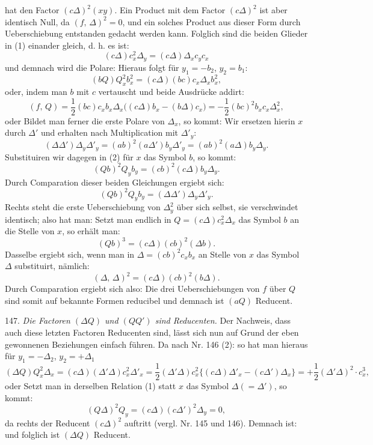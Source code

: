 hat den Factor $(c\Delta)^2(xy)$. Ein Product mit dem Factor $(c\Delta)^2$ ist aber identisch Null, da $(f,\,\Delta)^2 = 0$, und ein solches Product aus dieser Form durch Ueberschiebung entstanden gedacht werden kann. Folglich sind die beiden Glieder in (1) einander gleich, d. h. es ist:
\[
(c\Delta)c_x^2 \Delta_y = (c\Delta)\Delta_x c_y c_x
\]
und demnach wird die Polare:
Hieraus folgt für $y_1 = -b_2$, $y_2 = b_1$:
\[
(bQ)Q_x^2 b_x^2 = (c\Delta)(bc)c_x \Delta_x b_x^2,
\]
oder, indem man $b$ mit $c$ vertauscht und beide Ausdrücke addirt:
\[
(f,\,Q) = \frac{1}{2}(bc)c_x b_x \Delta_x \big((c\Delta)b_x - (b\Delta)c_x\big)
= -\frac{1}{2}(bc)^2 b_x c_x \Delta_x^2,
\]
oder
Bildet man ferner die erste Polare von $\Delta_x$, so kommt:
Wir ersetzen hierin $x$ durch $\Delta'$ und erhalten nach Multiplication mit $\Delta'_y$:
\[
(\Delta\Delta')\Delta_y \Delta'_y = (ab)^2(a\Delta')b_y \Delta'_y = (ab)^2(a\Delta)b_y \Delta_y.
\]
Substituiren wir dagegen in (2) für $x$ das Symbol $b$, so kommt:
\[
(Qb)^2 Q_y b_y = (cb)^2(c\Delta)b_y \Delta_y.
\]
Durch Comparation dieser beiden Gleichungen ergiebt sich:
\[
(Qb)^2 Q_y b_y = (\Delta\Delta')\Delta_y \Delta'_y.
\]
Rechts steht die erste Ueberschiebung von $\Delta_y^2$ über sich selbst, sie verschwindet identisch; also hat man:
Setzt man endlich in $Q = (c\Delta)c_x^2 \Delta_x$ das Symbol $b$ an die Stelle von $x$, so erhält man:
\[
(Qb)^3 = (c\Delta)(cb)^2(\Delta b).
\]
Dasselbe ergiebt sich, wenn man in $\Delta = (cb)^2 c_x b_x$ an Stelle von $x$ das Symbol $\Delta$ substituirt, nämlich:
\[
(\Delta,\,\Delta)^2 = (c\Delta)(cb)^2(b\Delta).
\]
Durch Comparation ergiebt sich also:
Die drei Ueberschiebungen von $f$ über $Q$ sind somit auf bekannte Formen reducibel und demnach ist $(aQ)$ Reducent.


147. \textit{Die Factoren $(\Delta Q)$ und $(QQ')$ sind Reducenten.} Der Nachweis, dass auch diese letzten Factoren Reducenten sind, lässt sich nun auf Grund der eben gewonnenen Beziehungen einfach führen. Da nach Nr. 146 (2):
so hat man hieraus für $y_1 = -\Delta_2$, $y_2 = +\Delta_1$
\[
(\Delta Q)Q_x^2 \Delta_x = (c\Delta)(\Delta'\Delta)c_x^2 \Delta'_x
= \frac{1}{2}(\Delta'\Delta)c_x^2 \{(c\Delta)\Delta'_x - (c\Delta')\Delta_x\}
= +\frac{1}{2}(\Delta'\Delta)^2 \cdot c_x^3,
\]
oder
Setzt man in derselben Relation (1) statt $x$ das Symbol $\Delta (= \Delta')$, so kommt:
\[
(Q\Delta)^2 Q_y = (c\Delta)(c\Delta')^2 \Delta_y = 0,
\]
da rechts der Reducent $(c\Delta)^2$ auftritt (vergl. Nr. 145 und 146). Demnach ist:
und folglich ist $(\Delta Q)$ Reducent.

